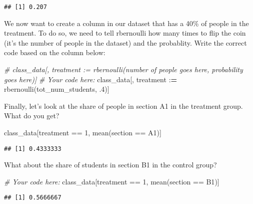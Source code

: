 \documentclass[
]{article}
\newenvironment{Shaded}{\begin{snugshade}}{\end{snugshade}}
\newcommand{\CommentTok}[1]{\textcolor[rgb]{0.56,0.35,0.01}{\textit{#1}}}
\newcommand{\DecValTok}[1]{\textcolor[rgb]{0.00,0.00,0.81}{#1}}
\newcommand{\ErrorTok}[1]{\textcolor[rgb]{0.64,0.00,0.00}{\textbf{#1}}}
\newcommand{\FunctionTok}[1]{\textcolor[rgb]{0.00,0.00,0.00}{#1}}
\newcommand{\NormalTok}[1]{#1}
\newcommand{\SpecialCharTok}[1]{\textcolor[rgb]{0.00,0.00,0.00}{#1}}
\newcommand{\StringTok}[1]{\textcolor[rgb]{0.31,0.60,0.02}{#1}}
\begin{document}
\begin{verbatim}
## [1] 0.207
\end{verbatim}

We now want to create a column in our dataset that has a 40\% of people
in the treatment. To do so, we need to tell rbernoulli how many times to
flip the coin (it's the number of people in the dataset) and the
probablity. Write the correct code based on the column below:

\begin{Shaded}
\begin{Highlighting}[]
\CommentTok{\# class\_data[, treatment := rbernoulli(number of people goes here, probability goes here)]}
\CommentTok{\# Your code here:}
\NormalTok{class\_data[, treatment }\SpecialCharTok{:}\ErrorTok{=} \FunctionTok{rbernoulli}\NormalTok{(tot\_num\_students, .}\DecValTok{4}\NormalTok{)]}
\end{Highlighting}
\end{Shaded}

Finally, let's look at the share of people in section A1 in the
treatment group. What do you get?

\begin{Shaded}
\begin{Highlighting}[]
\NormalTok{class\_data[treatment }\SpecialCharTok{==} \DecValTok{1}\NormalTok{, }\FunctionTok{mean}\NormalTok{(section }\SpecialCharTok{==} \StringTok{\textquotesingle{}A1\textquotesingle{}}\NormalTok{)]}
\end{Highlighting}
\end{Shaded}

\begin{verbatim}
## [1] 0.4333333
\end{verbatim}

What about the share of students in section B1 in the control group?

\begin{Shaded}
\begin{Highlighting}[]
\CommentTok{\# Your code here:}
\NormalTok{class\_data[treatment }\SpecialCharTok{==} \DecValTok{1}\NormalTok{, }\FunctionTok{mean}\NormalTok{(section }\SpecialCharTok{==} \StringTok{\textquotesingle{}B1\textquotesingle{}}\NormalTok{)]}
\end{Highlighting}
\end{Shaded}

\begin{verbatim}
## [1] 0.5666667
\end{verbatim}
\end{document}
